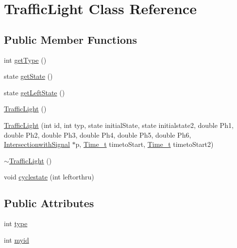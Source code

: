 \hypertarget{class_traffic_light}{\section{Traffic\-Light Class Reference}
\label{class_traffic_light}
}
\subsection*{Public Member Functions}
\begin{DoxyCompactItemize}
\item 
int \hyperlink{class_traffic_light_abce2ada7d1eeb16437d07acd50b2446b}{get\-Type} ()
\item 
state \hyperlink{class_traffic_light_aaee73cd4cff5ad4f7096c7c8e9e6bc4b}{get\-State} ()
\item 
state \hyperlink{class_traffic_light_ae710ff1d3ded24f933c4dd3816ba98e0}{get\-Left\-State} ()
\item 
\hyperlink{class_traffic_light_a28e72db41dcbd224a0a811d08ae20c3f}{Traffic\-Light} ()
\item 
\hyperlink{class_traffic_light_a7ed32935d0b40a941a56d74cbec790fd}{Traffic\-Light} (int id, int typ, state initial\-State, state initialstate2, double Ph1, double Ph2, double Ph3, double Ph4, double Ph5, double Ph6, \hyperlink{class_intersectionwith_signal}{Intersectionwith\-Signal} $\ast$p, \hyperlink{_common_defs_8h_a80b23eab88362163e2edd1a8b8238ef1}{Time\-\_\-t} timeto\-Start, \hyperlink{_common_defs_8h_a80b23eab88362163e2edd1a8b8238ef1}{Time\-\_\-t} timeto\-Start2)
\item 
\hyperlink{class_traffic_light_a3dd2a89a028c1586ced0ab587dda8cc1}{$\sim$\-Traffic\-Light} ()
\item 
void \hyperlink{class_traffic_light_a43310868b8badae122a037d85f009a0f}{cyclestate} (int leftorthru)
\end{DoxyCompactItemize}
\subsection*{Public Attributes}
\begin{DoxyCompactItemize}
\item 
int \hyperlink{class_traffic_light_abd951c68d768bc9d91aedd90e383a7b8}{type}
\item 
int \hyperlink{class_traffic_light_aa8b8852f0a75b737d741cdb831847208}{myid}
\end{DoxyCompactItemize}


